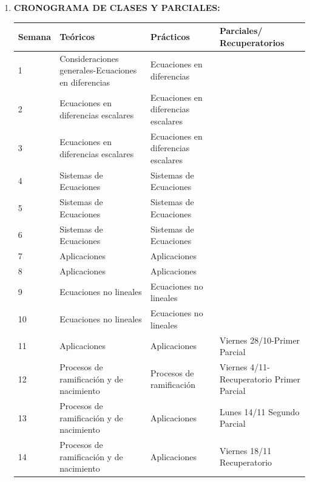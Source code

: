 \documentclass[12pt]{article}
\begin{document}
\begin{enumerate}
\item\textbf{CRONOGRAMA DE CLASES Y PARCIALES:}
\begin{table}[h]
\begin{tabular}{|m{1.3cm}|m{5cm}|m{5cm}|m{4cm}|}\hline
Semana  & Teóricos & Prácticos & Parciales/ Recuperatorios\\\hline \hline
1   & Consideraciones generales-Ecuaciones en diferencias   &  Ecuaciones en diferencias &   \\ \hline
  2 &  Ecuaciones en diferencias escalares & Ecuaciones en diferencias  escalares &   \\ \hline
  3 &  Ecuaciones en diferencias escalares   &   Ecuaciones en diferencias escalares &   \\ \hline
  4 & Sistemas de Ecuaciones  &  Sistemas de Ecuaciones  &   \\ \hline
  5 &   Sistemas de Ecuaciones  &  Sistemas de Ecuaciones   &   \\ \hline
  6 &  Sistemas de Ecuaciones   &  Sistemas de Ecuaciones  &   \\ \hline
  7 & Aplicaciones  &Aplicaciones   &   \\ \hline
  8 & Aplicaciones   & Aplicaciones  &   \\ \hline
  9 & Ecuaciones no lineales  & Ecuaciones no lineales  &   \\ \hline
  10 & Ecuaciones no lineales   & Ecuaciones no lineales  &   \\ \hline
  11 &  Aplicaciones  & Aplicaciones  & Viernes 28/10-Primer Parcial  \\ \hline
  12  & Procesos de ramificaci\'on y de nacimiento  & Procesos de ramificaci\'on &  Viernes 4/11-Recuperatorio Primer Parcial \\ \hline
   13 & Procesos de ramificaci\'on y de nacimiento   &   Aplicaciones  &  Lunes 14/11 Segundo Parcial  \\ \hline
   14 & Procesos de ramificaci\'on y de nacimiento   & Aplicaciones &   Viernes 18/11 Recuperatorio\\ \hline
\end{tabular}
\end{table}

\end{enumerate}

























%
%
%  
%  
\end{document}
